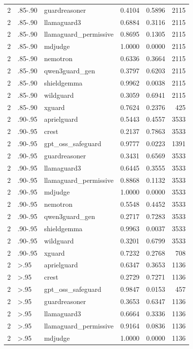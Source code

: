 \begin{tabular}{rllrrr}
2 & .85-.90 & guardreasoner & 0.4104 & 0.5896 & 2115 \\
2 & .85-.90 & llamaguard3 & 0.6884 & 0.3116 & 2115 \\
2 & .85-.90 & llamaguard\_permissive & 0.8695 & 0.1305 & 2115 \\
2 & .85-.90 & mdjudge & 1.0000 & 0.0000 & 2115 \\
2 & .85-.90 & nemotron & 0.6336 & 0.3664 & 2115 \\
2 & .85-.90 & qwen3guard\_gen & 0.3797 & 0.6203 & 2115 \\
2 & .85-.90 & shieldgemma & 0.9962 & 0.0038 & 2115 \\
2 & .85-.90 & wildguard & 0.3059 & 0.6941 & 2115 \\
2 & .85-.90 & xguard & 0.7624 & 0.2376 & 425 \\
2 & .90-.95 & aprielguard & 0.5443 & 0.4557 & 3533 \\
2 & .90-.95 & crest & 0.2137 & 0.7863 & 3533 \\
2 & .90-.95 & gpt\_oss\_safeguard & 0.9777 & 0.0223 & 1391 \\
2 & .90-.95 & guardreasoner & 0.3431 & 0.6569 & 3533 \\
2 & .90-.95 & llamaguard3 & 0.6445 & 0.3555 & 3533 \\
2 & .90-.95 & llamaguard\_permissive & 0.8868 & 0.1132 & 3533 \\
2 & .90-.95 & mdjudge & 1.0000 & 0.0000 & 3533 \\
2 & .90-.95 & nemotron & 0.5548 & 0.4452 & 3533 \\
2 & .90-.95 & qwen3guard\_gen & 0.2717 & 0.7283 & 3533 \\
2 & .90-.95 & shieldgemma & 0.9963 & 0.0037 & 3533 \\
2 & .90-.95 & wildguard & 0.3201 & 0.6799 & 3533 \\
2 & .90-.95 & xguard & 0.7232 & 0.2768 & 708 \\
2 & >.95 & aprielguard & 0.6347 & 0.3653 & 1136 \\
2 & >.95 & crest & 0.2729 & 0.7271 & 1136 \\
2 & >.95 & gpt\_oss\_safeguard & 0.9847 & 0.0153 & 457 \\
2 & >.95 & guardreasoner & 0.3653 & 0.6347 & 1136 \\
2 & >.95 & llamaguard3 & 0.6664 & 0.3336 & 1136 \\
2 & >.95 & llamaguard\_permissive & 0.9164 & 0.0836 & 1136 \\
2 & >.95 & mdjudge & 1.0000 & 0.0000 & 1136 \\

\end{tabular}
